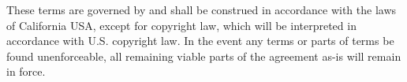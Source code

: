 \documentclass{article}
\newcommand{\hcm}[1][1]{\hspace{#1 cm}}
\begin{document}
\begin{flushleft}
\begin{center}
These terms are governed by and shall be construed in accordance with the laws of California USA, except for copyright law, which will be interpreted in accordance with U.S. copyright law. In the event any terms or parts of terms be found unenforceable, all remaining viable parts of the agreement as-is will remain in force.\\\hcm
\end{center}

\end{flushleft}
\end{document}
